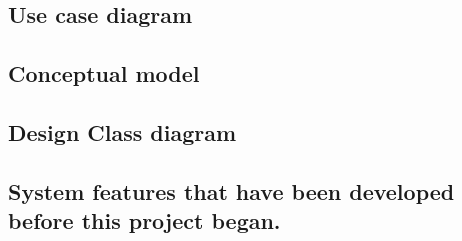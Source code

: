 \documentclass[12pt, a4paper]{article}
\begin{document}
\begin{CJK*}{UTF8}{bkai}
  \subsection{Use case diagram}

  \subsection{Conceptual model}

  \subsection{Design Class diagram}

  \subsection{System features that have been developed before this project began.}
\end{CJK*}
\end{document}
